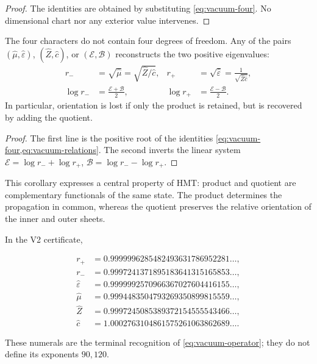 \begin{proof}
The identities are obtained by substituting \cref{eq:vacuum-four}. No dimensional chart nor any exterior value intervenes.
\end{proof}

\begin{corollary}
The four characters do not contain four degrees of freedom. Any of
the pairs \((\widehat\mu,\widehat\varepsilon)\),
\((\widehat Z,\widehat c)\), or \((\mathcal E,\mathcal B)\) reconstructs the
two positive eigenvalues:
\begin{align}
r_-&=\sqrt{\widehat\mu}
=\sqrt{\widehat Z/\widehat c},
&r_+&=\sqrt{\widehat\varepsilon}
=\frac1{\sqrt{\widehat Z\widehat c}},
\label{eq:vacuum-reconstruct-r}\\
\log r_-&=\frac{\mathcal E+\mathcal B}{2},
&\log r_+&=\frac{\mathcal E-\mathcal B}{2}.
\label{eq:vacuum-reconstruct-log}
\end{align}
In particular, orientation is lost if only the product is retained,
but is recovered by adding the quotient.
\end{corollary}

\begin{proof}
The first line is the positive root of the identities
\cref{eq:vacuum-four,eq:vacuum-relations}. The second inverts the linear
system
\(\mathcal E=\log r_-+\log r_+\),
\(\mathcal B=\log r_--\log r_+\).
\end{proof}

This corollary expresses a central property of HMT: product and quotient are
complementary functionals of the same state. The product determines the
propagation in common, whereas the quotient preserves the relative orientation
of the inner and outer sheets.

In the V2 certificate,

\begin{align*}
r_+&=0.9999996285482493631786952281\ldots,\\
r_-&=0.9997241371895183641315165853\ldots,\\
\widehat\varepsilon&=0.9999992570966367027604416155\ldots,\\
\widehat\mu&=0.9994483504793269350899815559\ldots,\\
\widehat Z&=0.9997245085389372154555543466\ldots,\\
\widehat c&=1.0002763104861575261063862689\ldots.
\end{align*}

These numerals are the terminal recognition of \cref{eq:vacuum-operator}; they do not define its exponents \(90,120\).

